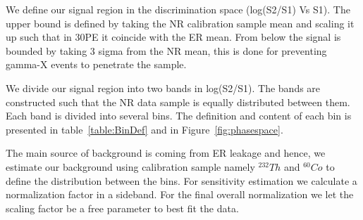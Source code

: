 We define our signal region in the discrimination space (log(S2/S1) Vs S1). The upper bound is defined by taking the NR calibration sample mean and scaling it up such that in 30PE it coincide with the ER mean. From below the signal is bounded by taking 3 sigma from the NR mean, this is done for preventing gamma-X events to penetrate the sample. 

We divide our signal region into two bands in log(S2/S1). The bands are constructed such that the NR data sample is equally distributed between them. Each band is divided into several bins. The definition and content of each bin is presented in table~\ref{table:BinDef} and in Figure~\ref{fig:phasespace}. 

The main source of background is coming from ER leakage and hence, we estimate our background using calibration sample namely $^{232}Th$ and $^{60}Co$ to define the distribution between the bins. For sensitivity estimation we calculate a normalization factor in a sideband. For the final overall normalization we let the scaling factor be a free parameter to best fit the data.


\begin{table}

\caption{Bins definition. The estimated background event is calculated by taking the calibration sample and scaling it by $6.54e-3$, which is a the ration between data and calibration in a sideband. The number of data events is the number of events from the DM data set in each bin.} \label{table:BinDef}

\end{table}


